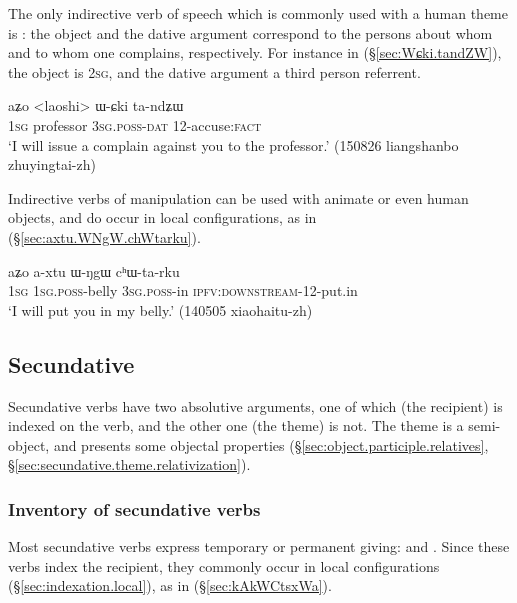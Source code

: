 The only indirective verb of speech which is commonly used with a human theme is : the object and the dative argument correspond to the persons about whom and to whom one complains, respectively. For instance in (§\ref{sec:Wɕki.tandZW}), the object is \textsc{2sg}, and the dative argument a third person referrent.

\begin{exe}
	\ex \label{sec:Wɕki.tandZW}
	\gll  aʑo <laoshi> ɯ-ɕki ta-ndʑɯ \\
	\textsc{1sg} professor \textsc{3sg}.\textsc{poss}-\textsc{dat} 1\fl{}2-accuse:\textsc{fact} \\
	\glt `I will issue a complain against you to the professor.' (150826 liangshanbo zhuyingtai-zh) 
\end{exe}

Indirective verbs of manipulation can be used with animate or even human objects, and do occur in local configurations, as in (§\ref{sec:axtu.WNgW.chWtarku}).

\begin{exe}
	\ex \label{sec:axtu.WNgW.chWtarku}
	\gll  aʑo a-xtu ɯ-ŋgɯ cʰɯ-ta-rku \\
	\textsc{1sg} \textsc{1sg}.\textsc{poss}-belly \textsc{3sg}.\textsc{poss}-in \textsc{ipfv}:\textsc{downstream}-1\fl{}2-put.in \\
	\glt `I will put you in my belly.' (140505 xiaohaitu-zh) 
\end{exe}

\subsection{Secundative} \label{sec:ditransitive.secundative}
   
Secundative verbs have two absolutive arguments, one of which (the recipient) is indexed on the verb, and the other one (the theme) is not. The theme is a semi-object, and presents some objectal properties (§\ref{sec:object.participle.relatives}, §\ref{sec:secundative.theme.relativization}).


\subsubsection{Inventory of secundative verbs}
Most secundative verbs express temporary or permanent giving:  and . Since these verbs index the recipient, they commonly occur in local configurations (§\ref{sec:indexation.local}), as in (§\ref{sec:kAkWCtsxWa}).

